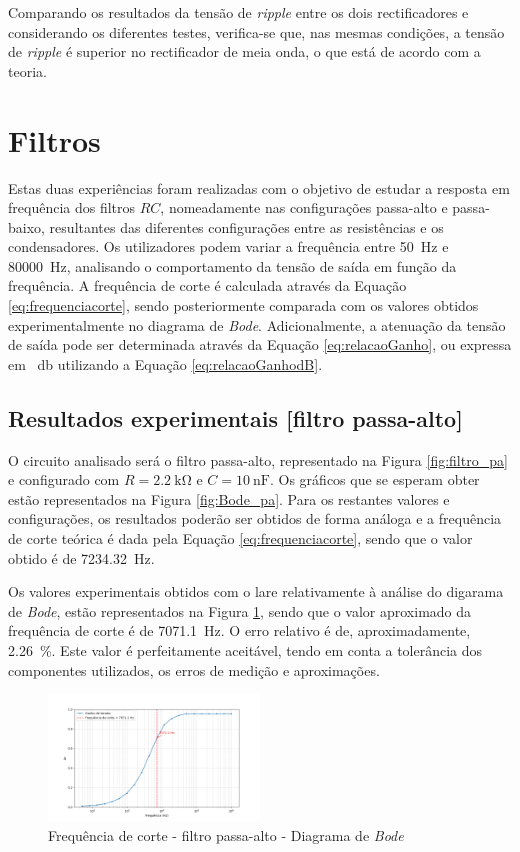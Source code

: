 Comparando os resultados da tensão de \textit{ripple} entre os dois rectificadores e considerando os diferentes testes, verifica-se que, nas mesmas condições, a tensão de \textit{ripple} é superior no rectificador de meia onda, o que está de acordo com a teoria.


\section{Filtros}
\label{sec:resultados_filtros}
Estas duas experiências foram realizadas com o objetivo de estudar a resposta em frequência dos filtros $RC$, nomeadamente nas configurações passa-alto e passa-baixo, resultantes das diferentes configurações entre as resistências e os condensadores. Os utilizadores podem variar a frequência entre \SI{50}{\hertz} e \SI{80000}{\hertz}, analisando o comportamento da tensão de saída em função da frequência. A frequência de corte é calculada através da Equação \ref{eq:frequenciacorte}, sendo posteriormente comparada com os valores obtidos experimentalmente no diagrama de \textit{Bode}. Adicionalmente, a atenuação da tensão de saída pode ser determinada através da Equação \ref{eq:relacaoGanho}, ou expressa em \SI{}{\decibel} utilizando a Equação \ref{eq:relacaoGanhodB}.

\subsection{Resultados experimentais [filtro passa-alto]}
\label{sec:resultados_filtros_passaalto}
O circuito analisado será o filtro passa-alto, representado na Figura \ref{fig:filtro_pa} e configurado com $R=\SI{2.2}{\kilo\ohm}$ e $C=\SI{10}{\nano\farad}$. Os gráficos que se esperam obter estão representados na Figura \ref{fig:Bode_pa}. Para os restantes valores e configurações, os resultados poderão ser obtidos de forma análoga e a frequência de corte teórica é dada pela Equação \ref{eq:frequenciacorte}, sendo que o valor obtido é de \SI{7234.32}{\hertz}.

Os valores experimentais obtidos com o \acrshort{lare} relativamente à análise do digarama de \textit{Bode}, estão representados na Figura \ref{fig:fcBode}, sendo que o valor aproximado da frequência de corte é de \SI{7071.1}{\hertz}. O erro relativo é de, aproximadamente, \SI{2.26}{\percent}. Este valor é perfeitamente aceitável, tendo em conta a tolerância dos componentes utilizados, os erros de medição e aproximações.

\begin{figure}[hbtp]
	\centering
	\includegraphics[width=0.5\textwidth]{figures/bode_hpf_fc.png}
	\caption{Frequência de corte - filtro passa-alto - Diagrama de \textit{Bode}}
	\label{fig:fcBode}
\end{figure}

